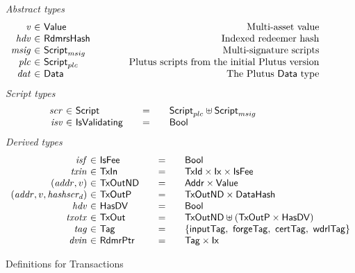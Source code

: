 \begin{figure*}[htb]
  \emph{Abstract types}
  \begin{equation*}
    \begin{array}{r@{~\in~}l@{\quad\quad\quad\quad}r}
      \var{v} &\Value & \text{Multi-asset value}\\
      \var{hdv} &\RdmrsHash & \text{Indexed redeemer hash}\\
      \var{msig} & \ScriptMSig & \text{Multi-signature scripts} \\
      \var{plc} & \ScriptPlutus & \text{Plutus scripts from the initial Plutus version} \\
      \var{dat} & \Data & \text{The Plutus $\Data$ type} \\
    \end{array}
  \end{equation*}
  \emph{Script types}
  \begin{equation*}
    \begin{array}{r@{~\in~}l@{\qquad=\qquad}lr}
      \var{scr} & \Script & \ScriptPlutus \uniondistinct \ScriptMSig \\
      \var{isv} & \IsValidating & \Bool \\
    \end{array}
  \end{equation*}
%
  \emph{Derived types}
  \begin{equation*}
    \begin{array}{r@{~\in~}l@{\qquad=\qquad}lr}
      \var{isf}
      & \IsFee
      & \Bool
      \\
      \var{txin}
      & \TxIn
      & \TxId \times \Ix \times \IsFee
      \\
      (\var{addr}, v)
      & \type{TxOutND}
      & \Addr \times \Value
      \\
      (\var{addr}, v, \var{hashscr_d})
      & \type{TxOutP}
      & \type{TxOutND} \times \DataHash
      \\
      \var{hdv}
      & \HasDV
      & \Bool
      \\
      \var{txotx}
      & \TxOut
      & \TxOutND \uniondistinct (\TxOutP \times \HasDV)
      \\
      \var{tag}
      & \Tag
      & \{\mathsf{inputTag},~\mathsf{forgeTag},~\mathsf{certTag},~\mathsf{wdrlTag}\}
      \\
      \var{dvin}
      & \RdmrPtr
      & \Tag \times \Ix
    \end{array}
  \end{equation*}
  \caption{Definitions for Transactions}
  \label{fig:defs:utxo-shelley-1}
\end{figure*}


